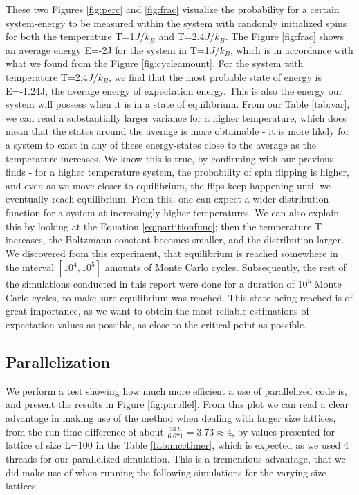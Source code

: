 \documentclass[10pt, nofootinbib, twocolumn]{revtex4-1}
\begin{document}
These two Figures \ref{fig:perc} and \ref{fig:frac} visualize the probability for a certain system-energy to be measured within the system with randomly initialized spins for both the temperature T=1$J/k_B$ and T=2.4$J/k_B$. The Figure \ref{fig:frac} shows an average energy E=-2J for the system in T=1$J/k_B$, which is in accordance with what we found from the Figure \ref{fig:cycleamount}. For the system with temperature T=2.4$J/k_B$, we find that the most probable state of energy is E=-1.24J, the average energy of expectation energy. This is also the energy our system will possess when it is in a state of equilibrium. From our Table \ref{tab:var}, we can read a substantially larger variance \cite{stats} for a higher temperature, which does mean that the states around the average is more obtainable - it is more likely for a system to exist in any of these energy-states close to the average as the temperature increases. We know this is true, by confirming with our previous finds - for a higher temperature system, the probability of spin flipping is higher, and even as we move closer to equilibrium, the flips keep happening until we eventually reach equilibrium. From this, one can expect a wider distribution function for a system at increasingly higher temperatures. We can also explain this by looking at the Equation \eqref{eq:partitionfunc}; then the temperature T increases, the Boltzmann constant becomes smaller, and the distribution larger. \\ 

We discovered from this experiment, that equilibrium is reached somewhere in the interval $[10^4 , 10^5]$ amounts of Monte Carlo cycles. Subsequently, the rest of the simulations conducted in this report were done for a duration of $10^5$ Monte Carlo cycles, to make sure equilibrium was reached. This state being reached is of great importance, as we want to obtain the most reliable estimations of expectation values as possible, as close to the critical point as possible.


\subsection{Parallelization}
We perform a test showing how much more efficient a use of parallelized code is, and present the results in Figure \ref{fig:parallel}. From this plot we can read a clear advantage in making use of the method when dealing with larger size lattices, from the run-time difference of about $\frac{24.9}{6.671}=3.73\approx 4$, by values presented for lattice of size L=100 in the Table \ref{tab:mcctimer}, which is expected as we used 4 threads for our parallelized simulation. This is a tremendous advantage, that we did make use of when running the following simulations for the varying size lattices. 
\end{document}
